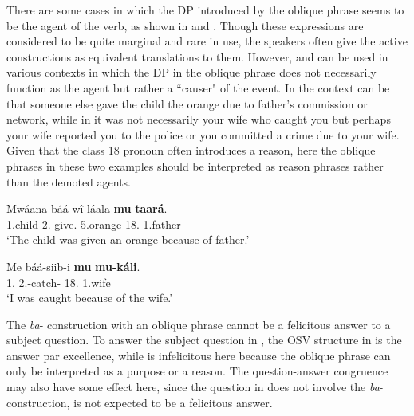 \documentclass[output=paper,colorlinks,citecolor=brown,
]{langscibook}
\begin{document}
There are some cases in which the DP introduced by the oblique phrase seems to be the agent of the verb, as shown in  and . Though these expressions are considered to be quite marginal and rare in use, the speakers often give the active constructions as equivalent translations to them. However,  and  can be used in various contexts in which the DP in the oblique phrase does not necessarily function as the agent but rather a ``causer" of the event. In  the context can be that someone else gave the child the orange due to father's commission or network, while in  it was not necessarily your wife who caught you but perhaps your wife reported you to the police or you committed a crime due to your wife. Given that the class 18 pronoun often introduces a reason, here the oblique phrases in these two examples should be interpreted as reason phrases rather than the demoted agents.
\begin{exe}
\ex
\label{132}
\gll
Mwáana báá-wî láala \textbf{mu} \textbf{taará}.\\
1.child 2\Sm{}.\Pst{}-give.\Pst{} 5.orange 18.\Loc{} 1.father\\
\trans ‘The child was given an orange because of father.’

\end{exe}
\begin{exe}
\ex
\label{133}
\gll
Me báá-siib-i \textbf{mu} \textbf{mu-káli}.\\
1\Sg{}.\Pro{} 2\Sm{}.\Pst{}-catch-\Pst{} 18.\Loc{} 1.wife\\
\trans ‘I was caught because of the wife.’

\end{exe}
The \textit{ba}- construction with an oblique phrase cannot be a felicitous answer to a subject question. To answer the subject question in , the OSV structure in  is the answer par excellence, while  is infelicitous here because the oblique phrase can only be interpreted as a purpose or a reason. The question-answer congruence may also have some effect here, since the question in  does not involve the \textit{ba}- construction,  is not expected to be a felicitous answer.
\end{document}
